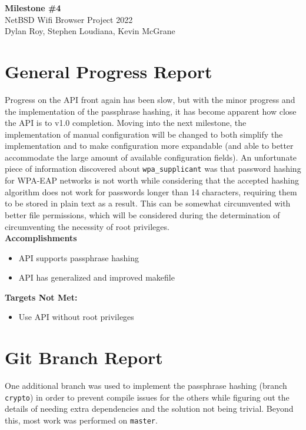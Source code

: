 \documentclass[11pt]{article}
\begin{document}
\begin{center}
  \textbf{\Large Milestone \#4}\\\large NetBSD Wifi Browser Project 2022\\
  Dylan Roy, Stephen Loudiana, Kevin McGrane
\end{center}


\section{General Progress Report}
Progress on the API front again has been slow, but with the minor progress
and the implementation of the passphrase hashing, it has become apparent
how close the API is to v1.0 completion. Moving into the next milestone, 
the implementation of manual configuration will be changed to both simplify
the implementation and to make configuration more expandable (and able to
better accommodate the large amount of available configuration fields). An
unfortunate piece of information discovered about \texttt{wpa\_supplicant}
was that password hashing for WPA-EAP networks is not worth while considering
that the accepted hashing algorithm does not work for passwords longer than
14 characters, requiring them to be stored in plain text as a result. This
can be somewhat circumvented with better file permissions, which will be considered
during the determination of circumventing the necessity of root privileges.\\

\textbf{Accomplishments}
\begin{itemize}
  \item API supports passphrase hashing
  \item API has generalized and improved makefile
\end{itemize}

\textbf{Targets Not Met:}
\begin{itemize}
  \item Use API without root privileges
\end{itemize}


\section{Git Branch Report}
One additional branch was used to implement the passphrase hashing (branch \texttt{crypto})
in order to prevent compile issues for the others while figuring out the
details of needing extra dependencies and the solution not being trivial.
Beyond this, most work was performed on \texttt{master}.
\end{document}
